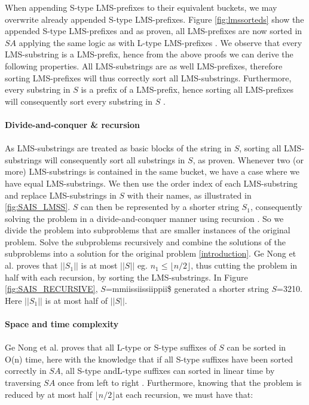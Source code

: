 \documentclass[12pt]{article} %
\begin{document}
When appending S-type LMS-prefixes to their equivalent buckets, we may overwrite already appended S-type LMS-prefixes. Figure \ref{fig:lmssorteds} show the appended S-type LMS-prefixes and as proven, all LMS-prefixes are now sorted in $SA$ applying the same logic as with L-type LMS-prefixes \cite{twoeffecient}. We observe that every LMS-substring is a LMS-prefix, hence from the above proofs we can derive the following  properties. All LMS-substrings are as well LMS-prefixes, therefore sorting LMS-prefixes will thus  correctly sort all LMS-substrings. Furthermore, every substring in $S$ is a prefix of a LMS-prefix, hence sorting all LMS-prefixes will consequently sort every substring in $S$ \cite{twoeffecient}.
\\ \\
\textbf{Divide-and-conquer \& recursion}
\\ \\
As LMS-substrings are treated as basic blocks of the string in $S$, sorting all LMS-substrings will consequently sort all  substrings in $S$, as proven. Whenever two (or more) LMS-substrings is contained in the same bucket, we have a case where we have equal LMS-substrings. We then use the order index of each LMS-substring and replace LMS-substrings in $S$ with their names, as illustrated in \ref{fig:SAIS_LMSS}. $S$ can then be represented by a shorter string $S_1$, consequently solving the problem in a divide-and-conquer manner using recursion \cite{twoeffecient}. So we divide the problem into subproblems that are smaller instances of the original problem. Solve the subproblems recursively  and combine the solutions of the subproblems into a solution for the original problem \ref{introduction}.
Ge Nong et al. \cite{twoeffecient} proves that $||S_1||$ is at most $||S||$ eg. $n_1 \leq \lfloor n/2 \rfloor$, thus cutting the problem in half with each recursion, by sorting the LMS-substrings. In Figure \ref{fig:SAIS_RECURSIVE}, $S$=mmiissiissiippii\$ generated a shorter string $S$=3210. Here $||S_1||$ is at most half of $||S||$.
\\ \\
\textbf{Space and time complexity}
\\ \\
Ge Nong et al. \cite{twoeffecient} proves that all L-type or S-type suffixes of $S$ can be sorted in O(n) time, here with the knowledge that if all S-type suffixes have been sorted correctly in $SA$, all S-type andL-type suffixes can sorted in linear time by traversing $SA$ once from left to right \cite{twoeffecient}. Furthermore, knowing that the problem is reduced by at most half  $\lfloor n/2 \rfloor$at each recursion, we must have that:
\end{document}
